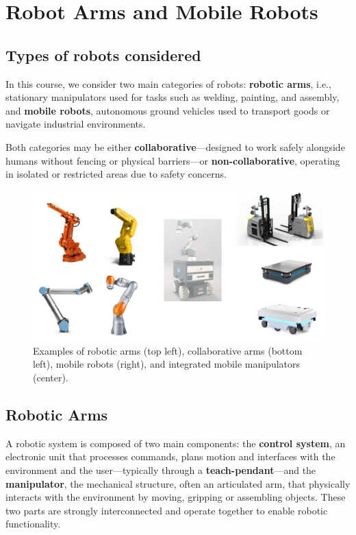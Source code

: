 \section{Robot Arms and Mobile Robots}

\subsection{Types of robots considered}

In this course, we consider two main categories of robots: \textbf{robotic arms}, i.e., stationary manipulators used for tasks such as welding, painting, and assembly, and \textbf{mobile robots}, autonomous ground vehicles used to transport goods or navigate industrial environments.

Both categories may be either \textbf{collaborative}—designed to work safely alongside humans without fencing or physical barriers—or \textbf{non-collaborative}, operating in isolated or restricted areas due to safety concerns.

\begin{figure}[H]
  \centering
  \includegraphics[width=\linewidth]{imgs/robot_types.png}
  \caption{Examples of robotic arms (top left), collaborative arms (bottom left), mobile robots (right), and integrated mobile manipulators (center).}
\end{figure}

\hfill

\subsection{Robotic Arms}

A robotic system is composed of two main components: the \textbf{control system}, an electronic unit that processes commands, plans motion and interfaces with the environment and the user—typically through a \textbf{teach-pendant}—and the \textbf{manipulator}, the mechanical structure, often an articulated arm, that physically interacts with the environment by moving, gripping or assembling objects. These two parts are strongly interconnected and operate together to enable robotic functionality.

